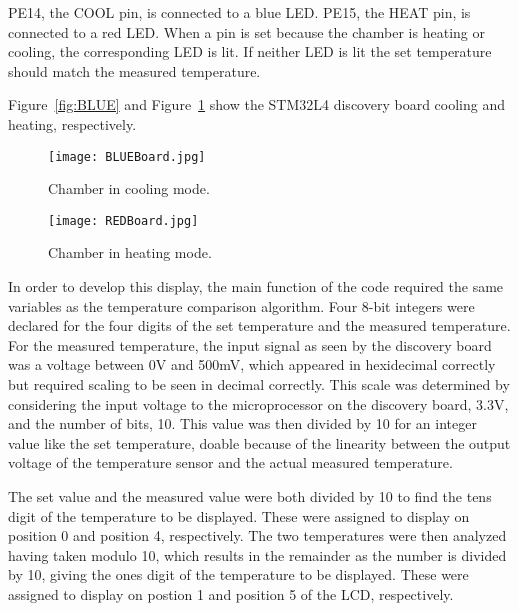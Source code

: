 \documentclass[11pt,letter]{article}
\providecommand{\DIFdelbegin}{} %
\providecommand{\DIFdelend}{} %
\providecommand{\DIFaddbeginFL}{} %
\providecommand{\DIFaddendFL}{} %
\providecommand{\DIFdelbeginFL}{} %
\providecommand{\DIFdelendFL}{} %
\newcommand{\DIFscaledelfig}{0.5}
\newlength{\DIFdelgraphicswidth} %
\newlength{\DIFdelgraphicsheight} %
\newcommand{\DIFaddincludegraphics}[2][]{{\color{blue}\fbox{\DIFOincludegraphics[#1]{#2}}}} %
\newcommand{\DIFdelincludegraphics}[2][]{%
\sbox{\DIFdelgraphicsbox}{\DIFOincludegraphics[#1]{#2}}%
\settoboxwidth{\DIFdelgraphicswidth}{\DIFdelgraphicsbox} %
\settoboxtotalheight{\DIFdelgraphicsheight}{\DIFdelgraphicsbox} %
\scalebox{\DIFscaledelfig}{%
\parbox[b]{\DIFdelgraphicswidth}{\usebox{\DIFdelgraphicsbox}\\[-\baselineskip] \rule{\DIFdelgraphicswidth}{0em}}\llap{\resizebox{\DIFdelgraphicswidth}{\DIFdelgraphicsheight}{%
\setlength{\unitlength}{\DIFdelgraphicswidth}%
\begin{picture}(1,1)%
\thicklines\linethickness{2pt} %
{\color[rgb]{1,0,0}\put(0,0){\framebox(1,1){}}}%
{\color[rgb]{1,0,0}\put(0,0){\line( 1,1){1}}}%
{\color[rgb]{1,0,0}\put(0,1){\line(1,-1){1}}}%
\end{picture}%
}\hspace*{3pt}}} %
} %
\DeclareRobustCommand{\DIFdelbegin}{\DIFOdelbegin \let\includegraphics\DIFdelincludegraphics} %
\DeclareRobustCommand{\DIFdelend}{\DIFOaddend \let\includegraphics\DIFOincludegraphics} %
\DeclareRobustCommand{\DIFaddbeginFL}{\DIFOaddbeginFL \let\includegraphics\DIFaddincludegraphics} %
\DeclareRobustCommand{\DIFaddendFL}{\DIFOaddendFL \let\includegraphics\DIFOincludegraphics} %
\DeclareRobustCommand{\DIFdelbeginFL}{\DIFOdelbeginFL \let\includegraphics\DIFdelincludegraphics} %
\DeclareRobustCommand{\DIFdelendFL}{\DIFOaddendFL \let\includegraphics\DIFOincludegraphics} %
\begin{document}
PE14, the COOL pin, is connected to a blue LED. PE15, the HEAT pin, is connected to a red LED. When a pin is set because the chamber is heating or cooling, the corresponding LED is lit. If neither LED is lit the set temperature should match the measured temperature. \DIFdelbegin %

\DIFdelend Figure~\ref{fig:BLUE} and Figure~\ref{fig:RED} show the STM32L4 discovery board cooling and heating, respectively. 

\begin{figure}[H]
    \centering
    \begin{minipage}{0.5\textwidth}
        \centering
        \DIFdelbeginFL %
\DIFdelendFL \DIFaddbeginFL \texttt{[image: BLUEBoard.jpg]} \DIFaddendFL %
        \caption{Chamber in cooling mode.}
        \label{fig:BLUE}
    \end{minipage}\hfill
    \begin{minipage}{0.5\textwidth}
        \centering
        \DIFdelbeginFL %
\DIFdelendFL \DIFaddbeginFL \texttt{[image: REDBoard.jpg]} \DIFaddendFL %
        \caption{Chamber in heating mode.}
        \label{fig:RED}
    \end{minipage}
\end{figure}

In order to develop this display, the main function of the code required the same variables as the temperature comparison algorithm. Four 8-bit integers were declared for the four digits of the set temperature and the measured temperature. For the measured temperature, the input signal as seen by the discovery board was a voltage between 0V and 500mV, which appeared in hexidecimal correctly but required scaling to be seen in decimal correctly. This scale was determined by considering the input voltage to the microprocessor on the discovery board, 3.3V, and the number of bits, 10. This value was then divided by 10 for an integer value like the set temperature, doable because of the linearity between the output voltage of the temperature sensor and the actual measured temperature.

The set value and the measured value were both divided by 10 to find the tens digit of the temperature to be displayed. These were assigned to display on position 0 and position 4, respectively. The two temperatures were then analyzed having taken modulo 10, which results in the remainder as the number is divided by 10, giving the ones digit of the temperature to be displayed. These were assigned to display on postion 1 and position 5 of the LCD, respectively. 
\end{document}
